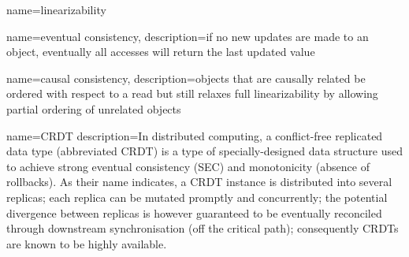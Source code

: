 %
%
%
%

{
    name=linearizability
}

{
    name={eventual consistency},
    description={if no new updates are made to an object, eventually all accesses will return the last updated value}
}

{
    name={causal consistency},
    description={objects that are causally related be ordered with respect to a read but still relaxes full linearizability by allowing partial ordering of unrelated objects}
}

{
  name={CRDT}
  description={In distributed computing, a conflict-free replicated data type (abbreviated CRDT) is a type of specially-designed data structure used to achieve strong eventual consistency (SEC) and monotonicity (absence of rollbacks). As their name indicates, a CRDT instance is distributed into several replicas; each replica can be mutated promptly and concurrently; the potential divergence between replicas is however guaranteed to be eventually reconciled through downstream synchronisation (off the critical path); consequently CRDTs are known to be highly available. \cite{crdt_wikipedia} }
}
